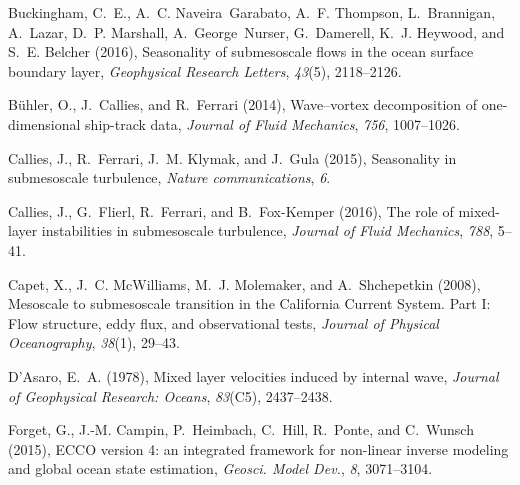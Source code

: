 \documentclass[grl]{agutex2015}
\begin{document}
\begin{article}
\begin{thebibliography}{18}
Buckingham, C.~E., A.~C. Naveira~Garabato, A.~F. Thompson, L.~Brannigan,
  A.~Lazar, D.~P. Marshall, A.~George~Nurser, G.~Damerell, K.~J. Heywood, and
  S.~E. Belcher (2016), {Seasonality of submesoscale flows in the ocean surface
  boundary layer}, \textit{Geophysical Research Letters}, \textit{43}(5),
  2118--2126.

B{\"u}hler, O., J.~Callies, and R.~Ferrari (2014), {Wave--vortex decomposition
  of one-dimensional ship-track data}, \textit{Journal of Fluid Mechanics},
  \textit{756}, 1007--1026.

Callies, J., R.~Ferrari, J.~M. Klymak, and J.~Gula (2015), {Seasonality in
  submesoscale turbulence}, \textit{Nature communications}, \textit{6}.

Callies, J., G.~Flierl, R.~Ferrari, and B.~Fox-Kemper (2016), {The role of
  mixed-layer instabilities in submesoscale turbulence}, \textit{Journal of
  Fluid Mechanics}, \textit{788}, 5--41.

Capet, X., J.~C. McWilliams, M.~J. Molemaker, and A.~Shchepetkin (2008),
  {Mesoscale to submesoscale transition in the California Current System. Part
  I: Flow structure, eddy flux, and observational tests}, \textit{Journal of
  Physical Oceanography}, \textit{38}(1), 29--43.

D'Asaro, E.~A. (1978), {Mixed layer velocities induced by internal wave},
  \textit{Journal of Geophysical Research: Oceans}, \textit{83}(C5),
  2437--2438.

Forget, G., J.-M. Campin, P.~Heimbach, C.~Hill, R.~Ponte, and C.~Wunsch (2015),
  {ECCO version 4: an integrated framework for non-linear inverse modeling and
  global ocean state estimation}, \textit{Geosci. Model Dev.}, \textit{8},
  3071--3104.


\end{thebibliography}
\end{article}
\end{document}
